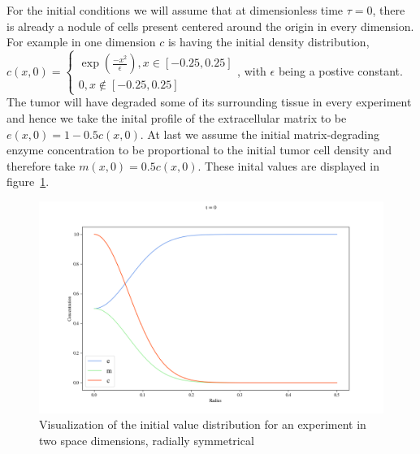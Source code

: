 For the initial conditions we will assume that at dimensionless time $\tau = 0$, there is already a nodule of cells present centered around the origin in every dimension. For example in one dimension $c$ is having the initial density distribution, 
$c(x,0)=
\begin{cases}
\exp(\frac{-x^2}{\epsilon}), x\in [-0.25, 0.25]\\
0, x\notin [-0.25,0.25]
\end{cases}
$, with $\epsilon$ being a postive constant. 
The tumor will have degraded some of its surrounding tissue in every experiment and hence we take the inital profile of the extracellular matrix to be $e(x,0) = 1 - 0.5 c(x,0)$. At last we assume the initial matrix-degrading enzyme concentration to be proportional to the initial tumor cell density and therefore take $m(x,0) = 0.5 c(x,0)$. These inital values are displayed in figure~\ref{fig:Initial_Value_Distribution}.\newline
\begin{figure}
    \centering
    \label{fig:Initial_Value_Distribution}
    \includegraphics[width=\textwidth]{resources/images/inital_values.png}
    \caption{Visualization of the initial value distribution for an experiment in two space dimensions, radially symmetrical}
\end{figure}









